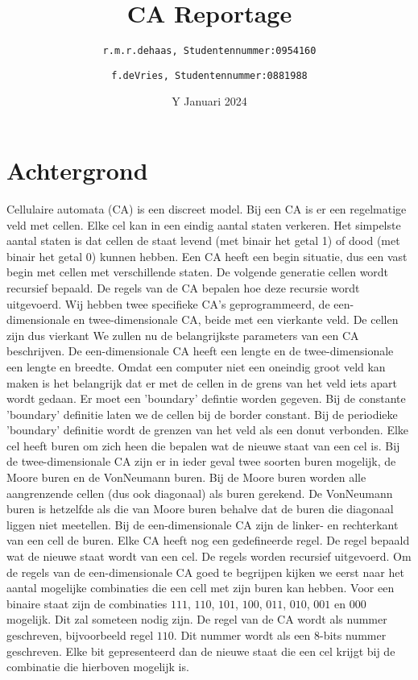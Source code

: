 \documentclass[12pt,a4paper]{article}
\title{CA Reportage}
\author{
\texttt{r.m.r.dehaas, \hspace{6pt} 
Studentennummer:\hspace{2pt}0954160}
\and
\texttt{f.deVries, \hspace{6pt}
Studentennummer:\hspace{2pt}0881988}}
\date{Y Januari 2024}
\begin{document}
\maketitle
\section*{Achtergrond}
Cellulaire automata (CA) is een discreet model. 
Bij een CA is er een regelmatige veld met cellen. 
Elke cel kan in een eindig aantal staten verkeren.
Het simpelste aantal staten is dat cellen 
de staat levend (met binair het getal 1) of dood (met binair het getal 0) kunnen hebben.
Een CA heeft een begin situatie, dus een vast begin met cellen met verschillende staten.
De volgende generatie cellen wordt recursief bepaald. 
De regels van de CA bepalen hoe deze recursie wordt uitgevoerd.
Wij hebben twee specifieke CA's geprogrammeerd, de een-dimensionale en 
twee-dimensionale CA, beide met een vierkante veld. 
De cellen zijn dus vierkant  
We zullen nu de belangrijkste parameters van een CA beschrijven.
De een-dimensionale CA heeft een lengte en de twee-dimensionale een lengte en breedte.
Omdat een computer niet een oneindig groot veld kan maken is het belangrijk dat 
er met de cellen in de grens van het veld iets apart wordt gedaan. Er moet een 'boundary' defintie worden gegeven.
Bij de constante 'boundary' definitie laten we de cellen bij de border constant.
Bij de periodieke 'boundary' definitie wordt de grenzen van het veld als een donut verbonden.
Elke cel heeft buren om zich heen die bepalen wat de nieuwe staat van een cel is.
Bij de twee-dimensionale CA zijn er in ieder geval twee soorten buren mogelijk, de Moore buren en de VonNeumann buren.
Bij de Moore buren worden alle aangrenzende cellen (dus ook diagonaal) als buren gerekend.
De VonNeumann buren is hetzelfde als die van Moore buren behalve dat de buren die diagonaal liggen niet meetellen.
Bij de een-dimensionale CA zijn de linker- en rechterkant van een cell de buren.
Elke CA heeft nog een gedefineerde regel. De regel bepaald wat de nieuwe staat wordt van een cel.
De regels worden recursief uitgevoerd.
Om de regels van de een-dimensionale CA goed te begrijpen kijken we eerst naar het aantal mogelijke combinaties die een cell met zijn buren kan hebben.
Voor een binaire staat zijn de combinaties $111$, $110$, $101$, $100$, $011$, $010$, $001$ en $000$ mogelijk.
Dit zal someteen nodig zijn.
De regel van de CA wordt als nummer geschreven, bijvoorbeeld regel $110$.
Dit nummer wordt als een 8-bits nummer geschreven. 
Elke bit gepresenteerd dan de nieuwe staat die een cel krijgt bij de combinatie die hierboven mogelijk is.
\end{document}
